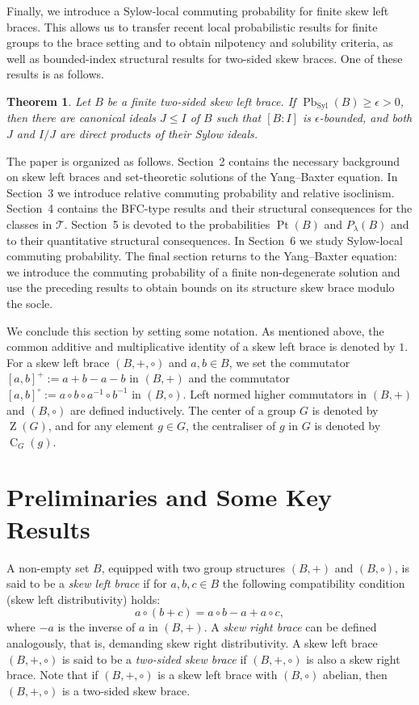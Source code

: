 \documentclass[10pt,a4paper]{amsart}
\numberwithin{equation}{section}
\newtheorem{thm}[equation]{Theorem}
\newcommand{\C}{\operatorname{C} }
\newcommand{\Z}{\operatorname{Z} }
\newcommand{\Pb}{\operatorname{Pb} }
\newcommand{\Pt}{\operatorname{Pt} }
\newcommand{\Syl}{\operatorname{Syl} }
\begin{document}
Finally, we introduce a Sylow-local commuting probability for finite skew left braces. This allows us to transfer recent local probabilistic results for finite groups to the brace setting and to obtain nilpotency and solubility criteria, as well as bounded-index structural results for two-sided skew braces. One of these results is as follows.

\begin{thm} %
Let $B$ be a finite two-sided skew left brace. If $\Pb_{\Syl}(B)\geqslant\epsilon>0$,
then there are canonical ideals $J \leqslant I$ of $B$ such that $[B:I]$ is
$\epsilon$-bounded, and both $J$ and $I/J$ are direct products of their
Sylow ideals.
\end{thm}

The paper is organized as follows. Section~2 contains the necessary background on skew left braces and set-theoretic solutions of the Yang--Baxter equation. In Section~3 we introduce relative commuting probability and relative isoclinism. Section~4 contains the BFC-type results and their structural consequences for the classes in $\mathcal T$. Section~5 is devoted to the probabilities $\Pt(B)$ and $P_\lambda(B)$ and to their quantitative structural consequences. In Section~6 we study Sylow-local commuting probability. The final section returns to the Yang--Baxter equation: we introduce the commuting probability of a finite non-degenerate solution and use the preceding results to obtain bounds on its structure skew brace modulo the socle.

We conclude this section by setting some notation. As mentioned above, the common additive and multiplicative identity of a skew left brace is denoted by $1$. For a skew left brace $(B, +, \circ)$ and $a, b \in B$, we set the commutator $[a, b]^+ := a+b-a-b$ in $(B, +)$ and the commutator $[a, b]^{\circ} := a\circ b \circ a^{-1} \circ b^{-1}$ in $(B, \circ)$. Left normed higher commutators in $(B, +)$ and $(B, \circ)$ are defined inductively. The center of a group $G$ is denoted by $\Z(G)$, and for any element $g \in G$, the centraliser of $g$ in $G$ is denoted by $\C_G(g)$.





\section{Preliminaries and Some Key Results}

A non-empty set $B$, equipped with two group structures  $(B,+)$ and $(B, \circ)$, is  said to be a {\it skew left brace} if for $a, b, c \in B$ the following compatibility condition (skew left distributivity) holds:
 $$a \circ (b + c) = a \circ b - a + a \circ c,$$
 where $-a$ is the inverse of $a$ in $(B, +)$. A {\it skew right brace} can be defined analogously, that is, demanding  skew right distributivity.
 A skew left brace $(B, +, \circ)$ is said to be a {\it two-sided skew brace} if $(B, +, \circ)$ is also  a skew right brace.   Note that if $(B, +, \circ)$ is a skew left brace with $(B, \circ)$ abelian, then $(B, +, \circ)$ is a two-sided skew brace.  
 
\end{document}
